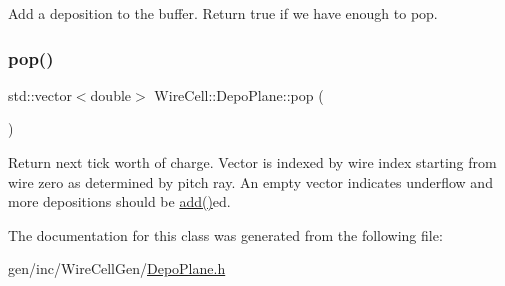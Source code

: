 Add a deposition to the buffer. Return true if we have enough to pop. 

\mbox{\label{class_wire_cell_1_1_depo_plane_a9b25723a24fe7c59c1be3bae8e3497fa}} 
\subsubsection{\texorpdfstring{pop()}{pop()}}
{\footnotesize\ttfamily std\+::vector$<$double$>$ Wire\+Cell\+::\+Depo\+Plane\+::pop (\begin{DoxyParamCaption}{ }\end{DoxyParamCaption})}

Return next tick worth of charge. Vector is indexed by wire index starting from wire zero as determined by pitch ray. An empty vector indicates underflow and more depositions should be \hyperlink{class_wire_cell_1_1_depo_plane_adbcc6a073be3c7b686d79cab4eb98408}{add()}\textquotesingle{}ed. 

The documentation for this class was generated from the following file\+:\begin{DoxyCompactItemize}
\item 
gen/inc/\+Wire\+Cell\+Gen/\hyperlink{_depo_plane_8h}{Depo\+Plane.\+h}\end{DoxyCompactItemize}
